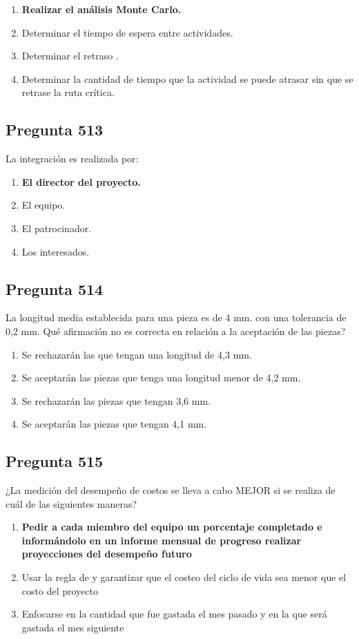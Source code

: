 \documentclass[11pt,a4paper]{article}
\begin{document}
\begin{enumerate}[label=\alph*)]
  \item \textbf{Realizar el análisis Monte Carlo.}
  \item Determinar el tiempo de espera entre actividades.
  \item Determinar el retraso .
  \item Determinar la cantidad de tiempo que la actividad se puede atrasar sin que se retrase la ruta crítica.
\end{enumerate}

\subsection*{Pregunta 513}
La integración es realizada por:

\begin{enumerate}[label=\alph*)]
  \item \textbf{El director del proyecto.}
  \item El equipo.
  \item El patrocinador.
  \item Los interesados.
\end{enumerate}

\subsection*{Pregunta 514}
La longitud media establecida para una pieza es de 4 mm. con una tolerancia de 0,2 mm. Qué afirmación no es correcta en relación a la aceptación de las piezas?

\begin{enumerate}[label=\alph*)]
  \item Se rechazarán las que tengan una longitud de 4,3 mm.
  \item Se aceptarán las piezas que tenga una longitud menor de 4,2 mm.
  \item Se rechazarán las piezas que tengan 3,6 mm.
  \item Se aceptarán las piezas que tengan 4,1 mm.
\end{enumerate}

\subsection*{Pregunta 515}
¿La medición del desempeño de costos se lleva a cabo MEJOR si se realiza de cuál de las siguientes maneras?

\begin{enumerate}[label=\alph*)]
  \item \textbf{Pedir a cada miembro del equipo un porcentaje completado e informándolo en un informe mensual de progreso realizar proyecciones del desempeño futuro}
  \item Usar la regla de y garantizar que el costeo del ciclo de vida sea menor que el costo del proyecto
  \item Enfocarse en la cantidad que fue gastada el mes pasado y en la que será gastada el mes siguiente
\end{enumerate}
\end{document}
